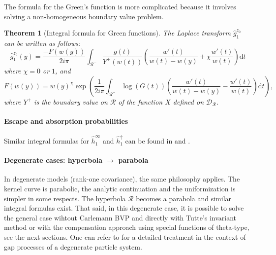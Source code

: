 \documentclass[11pt]{article}
\newcommand{\R}{\mathcal{R}}
\newcommand{\G}{\mathcal{D}_\mathcal{R}}
\newtheorem{theorem}[thm]{Theorem}
\theoremstyle{definition}
\begin{document}


The formula for the Green's function is more complicated because it involves solving a non-homogeneous boundary value problem.
\begin{theorem}[Integral formula for Green functions]
The Laplace transform $\widehat g_1^{z_0}$ can be written as follows:
$$
\widehat g_1^{z_0} (y)=
\frac{-F (w(y))}{2i\pi} \int_{\R^-} \frac{g(t)}{Y^+ (w(t))}
\left(
 \frac{w'(t) }{w(t)-w(y)}
 + \chi
  \frac{ w'(t) }{w(t)} 
  \right)
  \mathrm{d}t
$$
where $\chi=0$ or $1$, and
$$
F (w(y))=w(y)^{\chi} 
\exp  \left(
\frac{1}{2i\pi} \int_{\R^-} \log(G(t))\left(\frac{ w'(t)}{w(t)-w(y)}- \frac{ w'(t)}{w(t)} \right) \mathrm{d}t
\right),
$$
where $Y^+$ is the boundary value on $\R$ of the function $X$ defined on $\G$.
\end{theorem}

\paragraph{Escape and absorption probabilities}
Similar integral formulas for $\widehat{h}_1^\infty$ and $\widehat{h}_1^\uparrow$ can be found in \cite{franceschi_ernst_huang_escape_2021} and \cite{franceschi_fomichov_ivanovs_2022}.



\paragraph{Degenerate cases: hyperbola $\to$ parabola}
In degenerate models (rank-one covariance), the same philosophy applies.
The kernel curve is parabolic, the analytic continuation and the uniformization is simpler in some respects. The hyperbola $\R$ becomes a parabola and similar integral formulas exist. That said, in this degenerate case, it is possible to solve the general case wihtout Carlemann BVP and directly with Tutte's invariant method or with the compensation approach using special functions of theta-type, see the next sections. One can refer to \cite{franceschi_degenerate_asym_2025} for a detailed treatment in the context of gap processes of a degenerate particle system.
\end{document}
